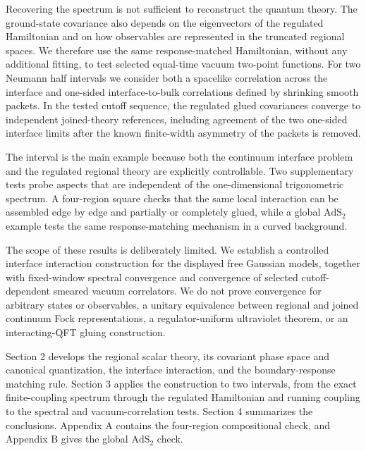 Recovering the spectrum is not sufficient to reconstruct the quantum theory. The ground-state covariance also depends on the eigenvectors of the regulated Hamiltonian and on how observables are represented in the truncated regional spaces. We therefore use the same response-matched Hamiltonian, without any additional fitting, to test selected equal-time vacuum two-point functions. For two Neumann half intervals we consider both a spacelike correlation across the interface and one-sided interface-to-bulk correlations defined by shrinking smooth packets. In the tested cutoff sequence, the regulated glued covariances converge to independent joined-theory references, including agreement of the two one-sided interface limits after the known finite-width asymmetry of the packets is removed.

The interval is the main example because both the continuum interface problem and the regulated regional theory are explicitly controllable. Two supplementary tests probe aspects that are independent of the one-dimensional trigonometric spectrum. A four-region square checks that the same local interaction can be assembled edge by edge and partially or completely glued, while a global \(\mathrm{AdS}_2\) example tests the same response-matching mechanism in a curved background.

The scope of these results is deliberately limited. We establish a controlled interface interaction construction for the displayed free Gaussian models, together with fixed-window spectral convergence and convergence of selected cutoff-dependent smeared vacuum correlators. We do not prove convergence for arbitrary states or observables, a unitary equivalence between regional and joined continuum Fock representations, a regulator-uniform ultraviolet theorem, or an interacting-QFT gluing construction.

Section 2 develops the regional scalar theory, its covariant phase space and canonical quantization, the interface interaction, and the boundary-response matching rule. Section 3 applies the construction to two intervals, from the exact finite-coupling spectrum through the regulated Hamiltonian and running coupling to the spectral and vacuum-correlation tests. Section 4 summarizes the conclusions. Appendix A contains the four-region compositional check, and Appendix B gives the global \(\mathrm{AdS}_2\) check.
